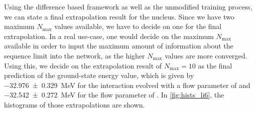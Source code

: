 Using the difference based framework as well as the unmodified training process, we can state a final extrapolation result for the  nucleus. Since we have two maximum $N_\mathrm{max}$ values available, we have to decide on one for the final extrapolation. In a real use-case, one would decide on the maximum $N_\mathrm{max}$ available in order to input the maximum amount of information about the sequence limit into the network, as the higher $N_\mathrm{max}$ values are more converged. Using this, we decide on the extrapolation result of $N_\mathrm{max} = 10$ as the final prediction of the  ground-state energy value, which is given by \SI{-32.976 \pm 0.329}{\mega\electronvolt} for the interaction evolved with a flow parameter of  and \SI{-32.542 \pm 0.272}{\mega\electronvolt} for the flow parameter of . In \autoref{fig:hists_li6}, the histograms of those extrapolations are shown.

